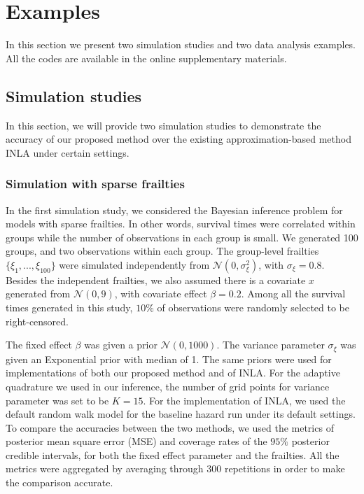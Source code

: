 \documentclass[ba]{imsart}
\begin{document}
\section{Examples}\label{sec:example}

In this section we present two simulation studies and two data analysis examples. All the codes are available in the online supplementary materials.

\subsection{Simulation studies}\label{subsec:sim}
In this section, we will provide two simulation studies to demonstrate the accuracy of our proposed method over the existing approximation-based method INLA under certain settings.

\subsubsection{Simulation with sparse frailties}\label{subsubsec:sim1}

In the first simulation study, we considered the Bayesian inference problem for models with sparse frailties. In other words, survival times were correlated within groups while the number of observations in each group is small. We generated 100 groups, and two observations within each group. The group-level frailties $\{\xi_1,...,\xi_{100}\}$ were simulated independently from $\mathcal{N}(0,\sigma_\xi^2)$, with $\sigma_{\xi} = 0.8$. Besides the independent frailties, we also assumed there is a covariate $x$ generated from $\mathcal{N}(0,9)$, with covariate effect $\beta = 0.2$. Among all the survival times generated in this study, $10\%$ of observations were randomly selected to be right-censored.

The fixed effect $\beta$ was given a prior $\mathcal{N}(0,1000)$. The variance parameter $\sigma_\xi$ was given an Exponential prior with median of 1. The same priors were used for implementations of both our proposed method and of INLA. For the adaptive quadrature we used in our inference, the number of grid points for variance parameter was set to be $K = 15$. For the implementation of INLA, we used the default random walk model for the baseline hazard run under its default settings. To compare the accuracies between the two methods, we used the metrics of posterior mean square error (MSE) and coverage rates of the $95\%$ posterior credible intervals, for both the fixed effect parameter and the frailties. All the metrics were aggregated by averaging through 300 repetitions in order to make the comparison accurate. 
\end{document}
